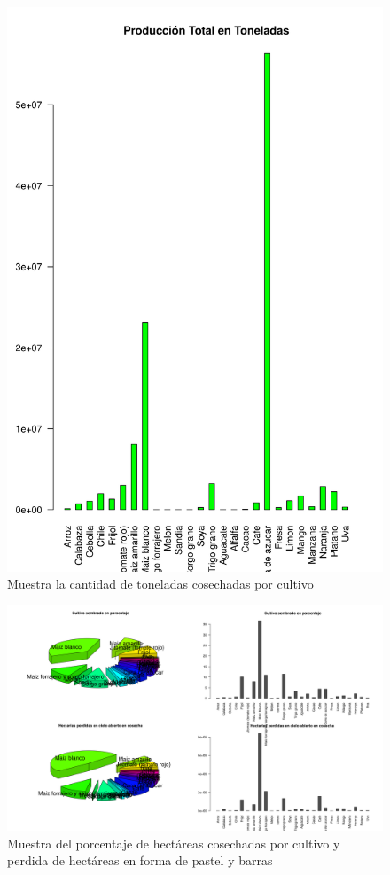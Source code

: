 \documentclass{article}
\begin{document}
\begin{figure}[ht]
\centering
\includegraphics[scale=.5]{Tablas_Produccion_Total.png}
\caption{Muestra la cantidad de toneladas cosechadas por cultivo}
\label{fig:produccion_total}
\end{figure}
\begin{figure}[ht]
\centering
\includegraphics[scale=.4]{Tablas_Comparativos.png}
\caption{Muestra del porcentaje de hectáreas cosechadas por cultivo y perdida de hectáreas en forma de pastel y barras}
\label{fig:produccion_total}
\end{figure}


\clearpage


\end{document}

